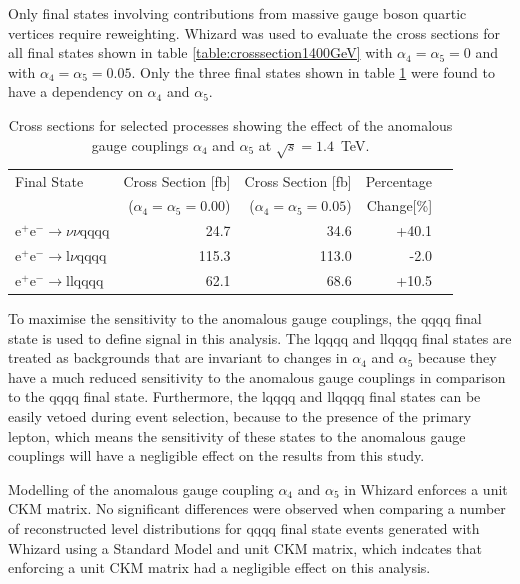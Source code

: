 Only final states involving contributions from massive gauge boson quartic vertices require reweighting.  Whizard was used to evaluate the cross sections for all final states shown in table \ref{table:crosssection1400GeV} with $\alpha_{4}=\alpha_{5}=0$ and with $\alpha_{4}=\alpha_{5}=0.05$.  Only the three final states shown in table \ref{table:crosssectionsensitivity1400} were found to have a dependency on $\alpha_{4}$ and $\alpha_{5}$.  

\begin{table}[h!]
\centering
\begin{tabular}{ l r r r r }
\hline
Final State & Cross Section [fb] & Cross Section [fb] & Percentage \\ 
& ($\alpha_{4} = \alpha_{5} = 0.00$) & ($\alpha_{4} = \alpha_{5} = 0.05$) & Change[\%] \\ 
\hline
$\text{e}^{+}\text{e}^{-} \rightarrow \nu{\nu}\text{qqqq}$ & 24.7 & 34.6 & +40.1 \\
$\text{e}^{+}\text{e}^{-} \rightarrow \text{l}{\nu}\text{qqqq}$ & 115.3 & 113.0 & -2.0 \\
$\text{e}^{+}\text{e}^{-} \rightarrow \text{llqqqq}$ & 62.1 & 68.6 & +10.5 \\
\hline
\end{tabular}
\caption[Cross sections for selected processes showing the effect of the anomalous gauge couplings $\alpha_{4}$ and $\alpha_{5}$ at $\sqrt{s}=1.4$~TeV.]{Cross sections for selected processes showing the effect of the anomalous gauge couplings $\alpha_{4}$ and $\alpha_{5}$ at $\sqrt{s}=1.4$~TeV.}
\label{table:crosssectionsensitivity1400}
\end{table}

To maximise the sensitivity to the anomalous gauge couplings, the \nu{\nu}qqqq final state is used to define signal in this analysis.  The l{\nu}qqqq and llqqqq final states are treated as backgrounds that are invariant to changes in $\alpha_{4}$ and $\alpha_{5}$ because they have a much reduced sensitivity to the anomalous gauge couplings in comparison to the \nu{\nu}qqqq final state.  Furthermore, the l{\nu}qqqq and llqqqq final states can be easily vetoed during event selection, because to the presence of the primary lepton, which means the sensitivity of these states to the anomalous gauge couplings will have a negligible effect on the results from this study.

Modelling of the anomalous gauge coupling $\alpha_{4}$ and $\alpha_{5}$ in Whizard enforces a unit CKM matrix.  No significant differences were observed when comparing a number of reconstructed level distributions for \nu{\nu}qqqq final state events generated with Whizard using a Standard Model and unit CKM matrix, which indcates that enforcing a unit CKM matrix had a negligible effect on this analysis.  

